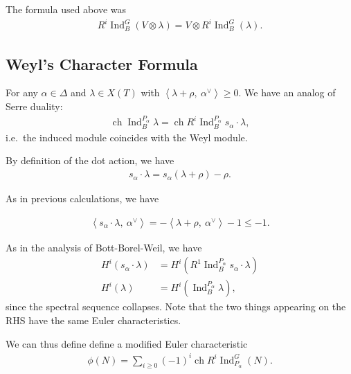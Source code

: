 \begin{remark}

The formula used above was
\begin{align*}  
R^i \operatorname{Ind}_B^G (V\otimes\lambda) = V\otimes R^i \operatorname{Ind}_B^G(\lambda)
.\end{align*}

\end{remark}

\hypertarget{weyls-character-formula-1}{%
\subsection{Weyl's Character Formula}\label{weyls-character-formula-1}}

For any \(\alpha\in\Delta\) and \(\lambda \in X(T)\) with
\({\left\langle {\lambda + \rho},~{\alpha^\vee} \right\rangle} \geq 0\).
We have an analog of Serre duality:
\begin{align*}  
\operatorname{ch}\operatorname{Ind}_B^{P_\alpha} \lambda = \operatorname{ch}R^i \operatorname{Ind}_B^{P_\alpha} s_\alpha \cdot \lambda
,\end{align*}
i.e.~the induced module coincides with the Weyl module.

By definition of the dot action, we have
\begin{align*}  
s_\alpha \cdot \lambda = s_\alpha(\lambda + \rho) - \rho
.\end{align*}

As in previous calculations, we have

\begin{align*}  
{\left\langle {s_\alpha\cdot\lambda},~{\alpha^\vee} \right\rangle} = -{\left\langle {\lambda+\rho},~{\alpha^\vee} \right\rangle} - 1 \leq - 1
.\end{align*}

As in the analysis of Bott-Borel-Weil, we have
\begin{align*}  
H^i(s_\alpha \cdot\lambda) &= H^i( R^1 \operatorname{Ind}_B^{P_\alpha} s_\alpha\cdot\lambda ) \\
H^i(\lambda) &= H^i( \operatorname{Ind}_B^{P_\alpha}\lambda )
,\end{align*}
since the spectral sequence collapses. Note that the two things
appearing on the RHS have the same Euler characteristics.

We can thus define define a modified Euler characteristic
\begin{align*}  
\phi(N) = \sum_{i\geq 0} (-1)^i \operatorname{ch}R^i \operatorname{Ind}_{P_\alpha}^G(N)
.\end{align*}

